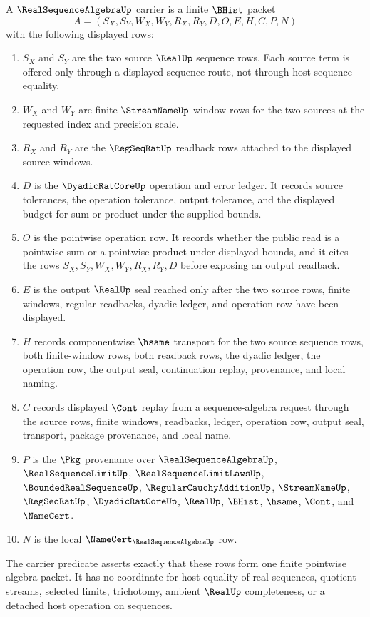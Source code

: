 \begin{definition}\label{def:real-sequence-algebra-carrier}
A $\RealSequenceAlgebraUp$ carrier is a finite $\BHist$ packet
$$
A=(S_X,S_Y,W_X,W_Y,R_X,R_Y,D,O,E,H,C,P,N)
$$
with the following displayed rows:
\begin{enumerate}
\item $S_X$ and $S_Y$ are the two source $\RealUp$ sequence rows. Each source term is offered only through a displayed sequence route, not through host sequence equality.
\item $W_X$ and $W_Y$ are finite $\StreamNameUp$ window rows for the two sources at the requested index and precision scale.
\item $R_X$ and $R_Y$ are the $\RegSeqRatUp$ readback rows attached to the displayed source windows.
\item $D$ is the $\DyadicRatCoreUp$ operation and error ledger. It records source tolerances, the operation tolerance, output tolerance, and the displayed budget for sum or product under the supplied bounds.
\item $O$ is the pointwise operation row. It records whether the public read is a pointwise sum or a pointwise product under displayed bounds, and it cites the rows $S_X,S_Y,W_X,W_Y,R_X,R_Y,D$ before exposing an output readback.
\item $E$ is the output $\RealUp$ seal reached only after the two source rows, finite windows, regular readbacks, dyadic ledger, and operation row have been displayed.
\item $H$ records componentwise $\hsame$ transport for the two source sequence rows, both finite-window rows, both readback rows, the dyadic ledger, the operation row, the output seal, continuation replay, provenance, and local naming.
\item $C$ records displayed $\Cont$ replay from a sequence-algebra request through the source rows, finite windows, readbacks, ledger, operation row, output seal, transport, package provenance, and local name.
\item $P$ is the $\Pkg$ provenance over $\RealSequenceAlgebraUp$, $\RealSequenceLimitUp$, $\RealSequenceLimitLawsUp$, $\BoundedRealSequenceUp$, $\RegularCauchyAdditionUp$, $\StreamNameUp$, $\RegSeqRatUp$, $\DyadicRatCoreUp$, $\RealUp$, $\BHist$, $\hsame$, $\Cont$, and $\NameCert$.
\item $N$ is the local $\NameCert_{\RealSequenceAlgebraUp}$ row.
\end{enumerate}
The carrier predicate asserts exactly that these rows form one finite pointwise algebra packet. It has no coordinate for host equality of real sequences, quotient streams, selected limits, trichotomy, ambient $\RealUp$ completeness, or a detached host operation on sequences.
\end{definition}

